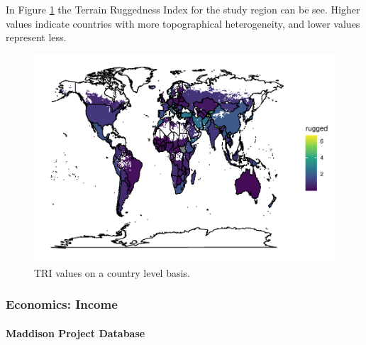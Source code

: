 \documentclass[12pt,twoside]{reedthesis}
\begin{document}
In Figure \ref{fig:TRI} the Terrain Ruggedness Index for the study region can be see. Higher values indicate countries with more topographical heterogeneity, and lower values represent less.
\begin{figure}

{\centering \includegraphics{thesis_files/figure-latex/TRI-1} 

}

\caption[Terrain Ruggedness Index values for the study area.]{TRI values on a country level basis. }\label{fig:TRI}
\end{figure}
\hypertarget{gdppc}{%
\subsubsection{Economics: Income}\label{gdppc}}

\hypertarget{maddison}{%
\paragraph{Maddison Project Database}\label{maddison}}
\end{document}
